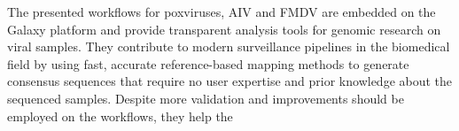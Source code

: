 The presented workflows for poxviruses, \ac{AIV} and \ac{FMDV} are embedded on the Galaxy platform and provide transparent analysis tools for genomic research on viral samples. They contribute to modern surveillance pipelines in the biomedical field by using fast, accurate reference-based mapping methods to generate consensus sequences that require no user expertise and prior knowledge about the sequenced samples. Despite more validation and improvements should be employed on the workflows, they help the 

